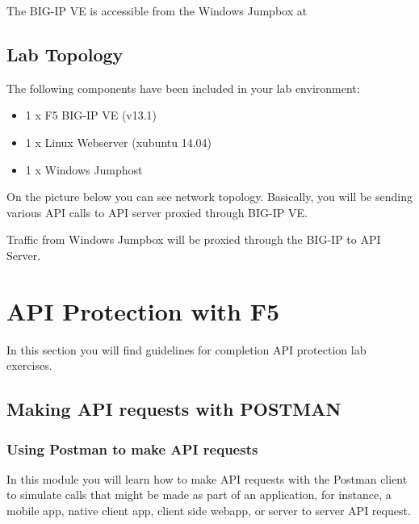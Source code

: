 \documentclass[letterpaper,10pt,english]{sphinxmanual}
\begin{document}
The BIG-IP VE is accessible from the Windows Jumpbox at 


\section{Lab Topology}
\label{\detokenize{intro:lab-topology}}
The following components have been included in your lab environment:
\begin{itemize}
\item {} 
1 x F5 BIG-IP VE (v13.1)

\item {} 
1 x Linux Webserver (xubuntu 14.04)

\item {} 
1 x Windows Jumphost

\end{itemize}

On the picture below you can see network topology. Basically, you will be sending various API calls to API server proxied through BIG-IP VE.
\begin{quote}

\noindent{}
\end{quote}

Traffic from Windows Jumpbox will be proxied through the BIG-IP to API Server.


\chapter{API Protection with F5}
\label{\detokenize{class1/class1:classname}}\label{\detokenize{class1/class1::doc}}
In this section you will find guidelines for completion API protection lab exercises.


\section{Making API requests with POSTMAN}
\label{\detokenize{class1/module1/module1::doc}}\label{\detokenize{class1/module1/module1:making-api-requests-with-postman}}

\subsection{Using Postman to make API requests}
\label{\detokenize{class1/module1/module1:using-postman-to-make-api-requests}}
In this module you will learn how to make API requests with the Postman
client to simulate calls that might be made as part of an application,
for instance, a mobile app, native client app, client side webapp, or
server to server API request.
\end{document}
